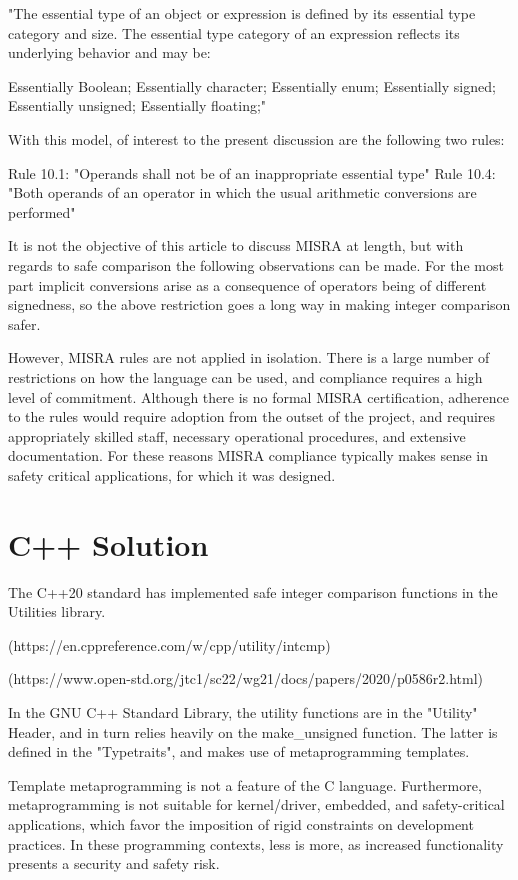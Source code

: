 \documentclass[11pt,letterpaper]{article}
\begin{document}
"The essential type of an object or expression is defined by its essential type category and size. The essential type category of an expression reflects its underlying behavior and may be:

Essentially Boolean;
Essentially character;
Essentially enum;
Essentially signed;
Essentially unsigned;
Essentially floating;"

With this model, of interest to the present discussion are the following two rules:

Rule 10.1: "Operands shall not be of an inappropriate essential type"
Rule 10.4: "Both operands of an operator in which the usual arithmetic conversions are performed"

It is not the objective of this article to discuss MISRA at length, but with regards to safe comparison the following observations can be made. For the most part implicit conversions arise as a consequence of operators being of different signedness, so the above restriction goes a long way in making integer comparison safer. 

However, MISRA rules are not applied in isolation. There is a large number of restrictions on how the language can be used, and compliance requires a high level of commitment. Although there is no formal MISRA certification, adherence to the rules would require adoption from the outset of the project, and requires appropriately skilled staff, necessary operational procedures, and extensive documentation. For these reasons MISRA compliance typically makes sense in safety critical applications, for which it was designed. 

\section{C++ Solution}
\label{sec:cppimplementation}

The C++20 standard has implemented safe integer comparison functions in the Utilities library.

(https://en.cppreference.com/w/cpp/utility/intcmp)

(https://www.open-std.org/jtc1/sc22/wg21/docs/papers/2020/p0586r2.html)

In the GNU C++ Standard Library, the utility functions are in the "Utility" Header, and in turn relies heavily on the make\_unsigned function. The latter is defined in the "Typetraits", and makes use of metaprogramming templates. 

Template metaprogramming is not a feature of the C language. Furthermore, metaprogramming is not suitable for kernel/driver, embedded, and safety-critical applications, which favor the imposition of rigid constraints on development practices. In these programming contexts, less is more, as increased functionality presents a security and safety risk. 
\end{document}
